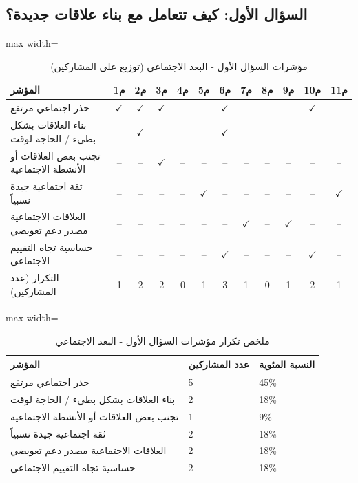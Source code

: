 \documentclass[12pt,oneside]{report}
\begin{document}
\subsection{السؤال الأول: كيف تتعامل مع بناء علاقات جديدة؟}
\begin{table}[H]
\centering
\caption{مؤشرات السؤال الأول - البعد الاجتماعي (توزيع على المشاركين)}
\scriptsize
\renewcommand{\arraystretch}{1.3}
\setlength{\tabcolsep}{4pt}
\begin{adjustbox}{max width=\textwidth}
\begin{tabular}{l c c c c c c c c c c c}
\toprule
\textbf{المؤشر} & \textbf{م1} & \textbf{م2} & \textbf{م3} & \textbf{م4} & \textbf{م5} & \textbf{م6} & \textbf{م7} & \textbf{م8} & \textbf{م9} & \textbf{م10} & \textbf{م11} \\
\midrule
حذر اجتماعي مرتفع & $\checkmark$ & $\checkmark$ & $\checkmark$ & -- & -- & $\checkmark$ & -- & -- & -- & $\checkmark$ & -- \\
بناء العلاقات بشكل بطيء / الحاجة لوقت & -- & $\checkmark$ & -- & -- & -- & $\checkmark$ & -- & -- & -- & -- & -- \\
تجنب بعض العلاقات أو الأنشطة الاجتماعية & -- & -- & $\checkmark$ & -- & -- & -- & -- & -- & -- & -- & -- \\
ثقة اجتماعية جيدة نسبياً & -- & -- & -- & -- & $\checkmark$ & -- & -- & -- & -- & -- & $\checkmark$ \\
العلاقات الاجتماعية مصدر دعم تعويضي & -- & -- & -- & -- & -- & -- & $\checkmark$ & -- & $\checkmark$ & -- & -- \\
حساسية تجاه التقييم الاجتماعي & -- & -- & -- & -- & -- & $\checkmark$ & -- & -- & -- & $\checkmark$ & -- \\
التكرار (عدد المشاركين) & 1 & 2 & 2 & 0 & 1 & 3 & 1 & 0 & 1 & 2 & 1 \\
\bottomrule
\end{tabular}
\end{adjustbox}
\end{table}
\begin{table}[H]
\centering
\caption{ملخص تكرار مؤشرات السؤال الأول - البعد الاجتماعي}
\small
\renewcommand{\arraystretch}{1.3}
\setlength{\tabcolsep}{4pt}
\begin{adjustbox}{max width=\textwidth}
\begin{tabular}{p{6cm} p{4cm} p{4cm}}
\toprule
\textbf{المؤشر} & \textbf{عدد المشاركين} & \textbf{النسبة المئوية} \\
\midrule
حذر اجتماعي مرتفع & 5 & 45\% \\
بناء العلاقات بشكل بطيء / الحاجة لوقت & 2 & 18\% \\
تجنب بعض العلاقات أو الأنشطة الاجتماعية & 1 & 9\% \\
ثقة اجتماعية جيدة نسبياً & 2 & 18\% \\
العلاقات الاجتماعية مصدر دعم تعويضي & 2 & 18\% \\
حساسية تجاه التقييم الاجتماعي & 2 & 18\% \\
\bottomrule
\end{tabular}
\end{adjustbox}
\end{table}
\end{document}
